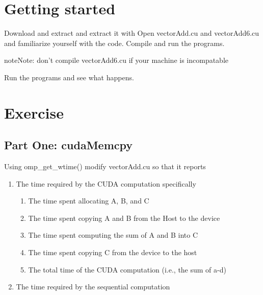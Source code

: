 \documentclass[letterpaper,10pt,openany,oneside]{sphinxmanual}
\begin{document}
\section{Getting started}
\label{1-VectorAdd/VectorAdd:getting-started}
Download and extract
and extract it with 
Open vectorAdd.cu and vectorAdd6.cu and familiarize yourself with the code.
Compile and run the programs.

\begin{notice}{note}{Note:}
don't compile vectorAdd6.cu if your machine is incompatable
\end{notice}

Run the programs and see what happens.


\section{Exercise}
\label{1-VectorAdd/VectorAdd:exercise}

\subsection{Part One: cudaMemcpy}
\label{1-VectorAdd/VectorAdd:part-one-cudamemcpy}
Using omp\_get\_wtime() modify vectorAdd.cu so that it reports
\begin{enumerate}
\item {} 
The time required by the CUDA computation specifically
\begin{enumerate}
\item {} 
The time spent allocating A, B, and C

\item {} 
The time spent copying A and B from the Host to the device

\item {} 
The time spent computing the sum of A and B into C

\item {} 
The time spent copying C from the device to the host

\item {} 
The total time of the CUDA computation (i.e., the sum of a-d)

\end{enumerate}

\item {} 
The time required by the sequential computation

\end{enumerate}
\end{document}
